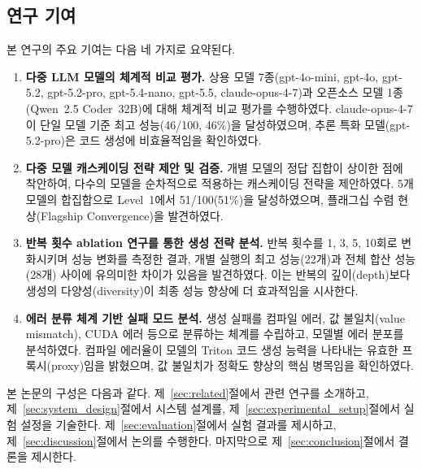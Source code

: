 \documentclass[sigplan,screen,review,anonymous]{acmart}
\begin{document}
\subsection{연구 기여}

본 연구의 주요 기여는 다음 네 가지로 요약된다.

\begin{enumerate}
    \item \textbf{다중 LLM 모델의 체계적 비교 평가.}
    상용 모델 7종(gpt-4o-mini, gpt-4o, gpt-5.2, gpt-5.2-pro, gpt-5.4-nano, gpt-5.5, claude-opus-4-7)과
    오픈소스 모델 1종(Qwen~2.5 Coder~32B)에 대해
    체계적 비교 평가를 수행하였다.
    claude-opus-4-7이 단일 모델 기준 최고 성능(46/100, 46\%)을 달성하였으며,
    추론 특화 모델(gpt-5.2-pro)은 코드 생성에 비효율적임을 확인하였다.

    \item \textbf{다중 모델 캐스케이딩 전략 제안 및 검증.}
    개별 모델의 정답 집합이 상이한 점에 착안하여,
    다수의 모델을 순차적으로 적용하는 캐스케이딩 전략을 제안하였다.
    5개 모델의 합집합으로 Level~1에서 51/100(51\%)을 달성하였으며,
    플래그십 수렴 현상(Flagship Convergence)을 발견하였다.

    \item \textbf{반복 횟수 ablation 연구를 통한 생성 전략 분석.}
    반복 횟수를 1, 3, 5, 10회로 변화시키며
    성능 변화를 측정한 결과, 개별 실행의 최고 성능(22개)과
    전체 합산 성능(28개) 사이에 유의미한 차이가 있음을 발견하였다.
    이는 반복의 깊이(depth)보다 생성의 다양성(diversity)이
    최종 성능 향상에 더 효과적임을 시사한다.

    \item \textbf{에러 분류 체계 기반 실패 모드 분석.}
    생성 실패를 컴파일 에러, 값 불일치(value mismatch),
    CUDA 에러 등으로 분류하는 체계를 수립하고,
    모델별 에러 분포를 분석하였다.
    컴파일 에러율이 모델의 Triton 코드 생성 능력을 나타내는
    유효한 프록시(proxy)임을 밝혔으며,
    값 불일치가 정확도 향상의 핵심 병목임을 확인하였다.
\end{enumerate}

본 논문의 구성은 다음과 같다.
제~\ref{sec:related}절에서 관련 연구를 소개하고,
제~\ref{sec:system_design}절에서 시스템 설계를,
제~\ref{sec:experimental_setup}절에서 실험 설정을 기술한다.
제~\ref{sec:evaluation}절에서 실험 결과를 제시하고,
제~\ref{sec:discussion}절에서 논의를 수행한다.
마지막으로 제~\ref{sec:conclusion}절에서 결론을 제시한다.


\end{document}
